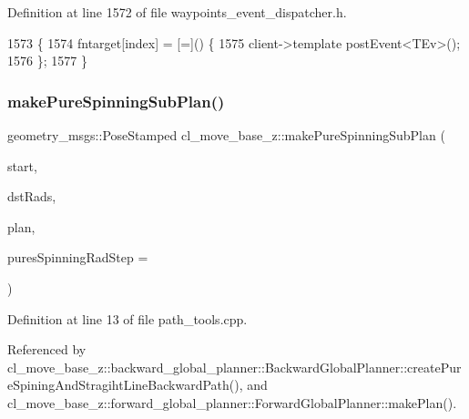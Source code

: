 Definition at line 1572 of file waypoints\+\_\+event\+\_\+dispatcher.\+h.


\begin{DoxyCode}
1573 \{
1574     fntarget[index] = [=]() \{
1575         client->template postEvent<TEv>();
1576     \};
1577 \}
\end{DoxyCode}
\mbox{\label{namespacecl__move__base__z_ac774e138510eb7b5e0015be1f7709e19}} 
\subsubsection{\texorpdfstring{make\+Pure\+Spinning\+Sub\+Plan()}{makePureSpinningSubPlan()}}
{\footnotesize\ttfamily geometry\+\_\+msgs\+::\+Pose\+Stamped cl\+\_\+move\+\_\+base\+\_\+z\+::make\+Pure\+Spinning\+Sub\+Plan (\begin{DoxyParamCaption}\item[{const geometry\+\_\+msgs\+::\+Pose\+Stamped \&}]{start,  }\item[{double}]{dst\+Rads,  }\item[{std\+::vector$<$ geometry\+\_\+msgs\+::\+Pose\+Stamped $>$ \&}]{plan,  }\item[{double}]{pures\+Spinning\+Rad\+Step = {} }\end{DoxyParamCaption})}



Definition at line 13 of file path\+\_\+tools.\+cpp.



Referenced by cl\+\_\+move\+\_\+base\+\_\+z\+::backward\+\_\+global\+\_\+planner\+::\+Backward\+Global\+Planner\+::create\+Pure\+Spining\+And\+Stragiht\+Line\+Backward\+Path(), and cl\+\_\+move\+\_\+base\+\_\+z\+::forward\+\_\+global\+\_\+planner\+::\+Forward\+Global\+Planner\+::make\+Plan().


